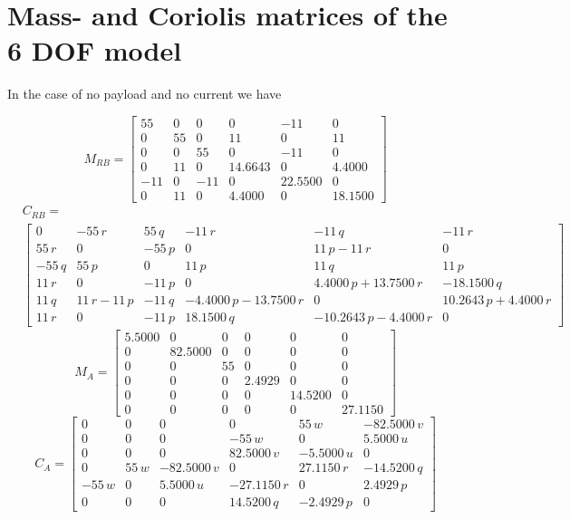 \documentclass[12pt,a4]{article}
\begin{document}
\section{Mass- and Coriolis matrices of the 6 DOF model}
In the case of no payload and no current we have

\begin{equation*}
	M_{RB} = \left[\begin{array}{cccccc} 55 & 0 & 0 & 0 & -11 & 0\\ 0 & 55 & 0 & 11 & 0 & 11\\ 0 & 0 & 55 & 0 & -11 & 0\\ 0 & 11 & 0 & 14.6643 & 0 & 4.4000\\ -11 & 0 & -11 & 0 & 22.5500 & 0\\ 0 & 11 & 0 & 4.4000 & 0 & 18.1500 \end{array}\right]
\end{equation*}
\begin{align*}
	 & C_{RB} =                               \\
	 & \left[\begin{array}{cccccc} 0 & -55\,r & 55\,q & -11\,r & -11\,q & -11\,r\\ 55\,r & 0 & -55\,p & 0 & 11\,p-11\,r & 0\\ -55\,q & 55\,p & 0 & 11\,p & 11\,q & 11\,p\\ 11\,r & 0 & -11\,p & 0 & 4.4000\,p+13.7500\,r & -18.1500\,q\\ 11\,q & 11\,r-11\,p & -11\,q & -4.4000\,p-13.7500\,r & 0 & 10.2643\,p+4.4000\,r\\ 11\,r & 0 & -11\,p & 18.1500\,q & -10.2643\,p-4.4000\,r & 0 \end{array}\right]
\end{align*}
\begin{equation*}
	M_{A} = \left[\begin{array}{cccccc} 5.5000 & 0 & 0 & 0 & 0 & 0\\ 0 & 82.5000 & 0 & 0 & 0 & 0\\ 0 & 0 & 55 & 0 & 0 & 0\\ 0 & 0 & 0 & 2.4929 & 0 & 0\\ 0 & 0 & 0 & 0 & 14.5200 & 0\\ 0 & 0 & 0 & 0 & 0 & 27.1150 \end{array}\right]
\end{equation*}
\begin{equation*}
	C_{A} = \left[\begin{array}{cccccc} 0 & 0 & 0 & 0 & 55\,w & -82.5000\,v\\ 0 & 0 & 0 & -55\,w & 0 & 5.5000\,u\\ 0 & 0 & 0 & 82.5000\,v & -5.5000\,u & 0\\ 0 & 55\,w & -82.5000\,v & 0 & 27.1150\,r & -14.5200\,q\\ -55\,w & 0 & 5.5000\,u & -27.1150\,r & 0 & 2.4929\,p\\ 0 & 0 & 0 & 14.5200\,q & -2.4929\,p & 0 \end{array}\right]
\end{equation*}
\end{document}
